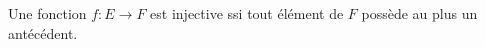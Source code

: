 Une fonction $f : E\to F$ est injective ssi tout élément de $F$ possède au plus un antécédent.

\begin{reponses}
\end{reponses}

